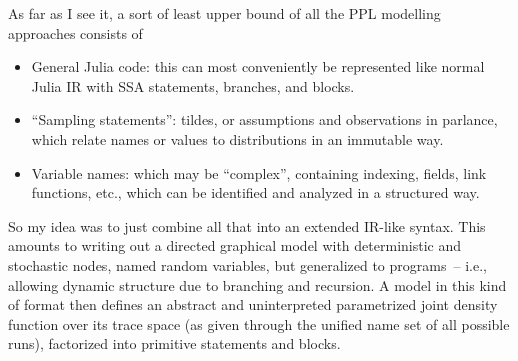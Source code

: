As far as I see it, a sort of least upper bound of all the PPL modelling approaches consists of
\begin{itemize}
  \tightlist
\item General Julia code: this can most conveniently be represented like normal Julia IR with SSA
statements, branches, and blocks.
\item \enquote{Sampling statements}: tildes, or assumptions and observations in \turingjl{}
  parlance, which relate names or values to distributions in an immutable way.
\item Variable names: which may be \enquote{complex}, containing indexing, fields, link functions,
  etc., which can be identified and analyzed in a structured way.
\end{itemize}
So my idea was to just combine all that into an extended IR-like syntax.  This amounts to writing
out a directed graphical model with deterministic and stochastic nodes, named random variables, but
generalized to programs~-- i.e., allowing dynamic structure due to branching and recursion.  A model
in this kind of format then defines an abstract and uninterpreted parametrized joint density
function over its trace space (as given through the unified name set of all possible runs),
factorized into primitive statements and blocks.








